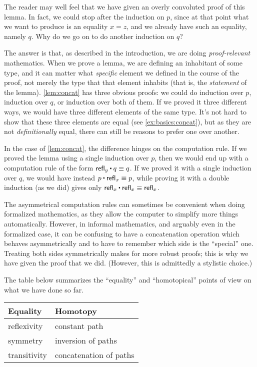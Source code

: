 The reader may well feel that we have given an overly convoluted proof of this lemma.
In fact, we could stop after the induction on $p$, since at that point what we want to produce is an equality $x=z$, and we already have such an equality, namely $q$.
Why do we go on to do another induction on $q$?

The answer is that, as described in the introduction, we are doing \emph{proof-relevant} mathematics.
%
When we prove a lemma, we are defining an inhabitant of some type, and it can matter what \emph{specific} element we defined in the course of the proof, not merely the type that that element inhabits (that is, the \emph{statement} of the lemma).
\autoref{lem:concat} has three obvious proofs: we could do induction over $p$, induction over $q$, or induction over both of them.
If we proved it three different ways, we would have three different elements of the same type.
It's not hard to show that these three elements are equal (see \autoref{ex:basics:concat}), but as they are not \emph{definitionally} equal, there can still be reasons to prefer one over another.

In the case of \autoref{lem:concat}, the difference hinges on the computation rule.
If we proved the lemma using a single induction over $p$, then we would end up with a computation rule of the form $\refl{y} \ct q \jdeq q$.
If we proved it with a single induction over $q$, we would have instead $p\ct\refl{x}\jdeq p$, while proving it with a double induction (as we did) gives only $\refl{x}\ct\refl{x} \jdeq \refl{x}$.

The asymmetrical computation rules can sometimes be convenient when doing formalized mathematics, as they allow the computer to simplify more things automatically.
However, in informal mathematics, and arguably even in the formalized case, it can be confusing to have a concatenation operation which behaves asymmetrically and to have to remember which side is the ``special'' one.
Treating both sides symmetrically makes for more robust proofs; this is why we have given the proof that we did.
(However, this is admittedly a stylistic choice.)

The table below summarizes the ``equality'' and ``homotopical'' points of view on what we have done so far.
\begin{center}
  \medskip
  \begin{tabular}{ll}
    \toprule
    Equality & Homotopy \\
    \midrule
    reflexivity & constant path\\
    symmetry & inversion of paths\\
    transitivity & concatenation of paths \\
    \bottomrule
  \end{tabular}
  \medskip
\end{center}

